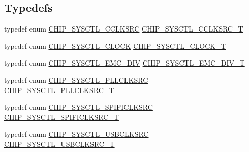 \subsection*{Typedefs}
\begin{DoxyCompactItemize}
\item 
typedef enum \hyperlink{group__CLOCK__17XX__40XX_ga1eb1eeae65911ee3e97009ae1d31d03f}{C\+H\+I\+P\+\_\+\+S\+Y\+S\+C\+T\+L\+\_\+\+C\+C\+L\+K\+S\+RC} \hyperlink{group__CLOCK__17XX__40XX_ga983f42d70f3939d1f1b46673e9e1f838}{C\+H\+I\+P\+\_\+\+S\+Y\+S\+C\+T\+L\+\_\+\+C\+C\+L\+K\+S\+R\+C\+\_\+T}
\item 
typedef enum \hyperlink{group__CLOCK__17XX__40XX_ga16115d41e6af3d543d4c5457d8d8343c}{C\+H\+I\+P\+\_\+\+S\+Y\+S\+C\+T\+L\+\_\+\+C\+L\+O\+CK} \hyperlink{group__CLOCK__17XX__40XX_ga82e75cbe777e79f448fec3987ddd978e}{C\+H\+I\+P\+\_\+\+S\+Y\+S\+C\+T\+L\+\_\+\+C\+L\+O\+C\+K\+\_\+T}
\item 
typedef enum \hyperlink{group__CLOCK__17XX__40XX_gadc2ca347f1f0b0dc25a6605aa60adc65}{C\+H\+I\+P\+\_\+\+S\+Y\+S\+C\+T\+L\+\_\+\+E\+M\+C\+\_\+\+D\+IV} \hyperlink{group__CLOCK__17XX__40XX_ga5c0927d2ce01f4ed4d10d76e44a4773e}{C\+H\+I\+P\+\_\+\+S\+Y\+S\+C\+T\+L\+\_\+\+E\+M\+C\+\_\+\+D\+I\+V\+\_\+T}
\item 
typedef enum \hyperlink{group__CLOCK__17XX__40XX_gab8e9f23b5fc6f78e50dbe7310743573d}{C\+H\+I\+P\+\_\+\+S\+Y\+S\+C\+T\+L\+\_\+\+P\+L\+L\+C\+L\+K\+S\+RC} \hyperlink{group__CLOCK__17XX__40XX_gacda7fd6d13922330ce9344dbc4ec85b7}{C\+H\+I\+P\+\_\+\+S\+Y\+S\+C\+T\+L\+\_\+\+P\+L\+L\+C\+L\+K\+S\+R\+C\+\_\+T}
\item 
typedef enum \hyperlink{group__CLOCK__17XX__40XX_gabb651badc795c7e52adc180f7bc68db2}{C\+H\+I\+P\+\_\+\+S\+Y\+S\+C\+T\+L\+\_\+\+S\+P\+I\+F\+I\+C\+L\+K\+S\+RC} \hyperlink{group__CLOCK__17XX__40XX_ga55d8797a3b68191ced784240378f74ac}{C\+H\+I\+P\+\_\+\+S\+Y\+S\+C\+T\+L\+\_\+\+S\+P\+I\+F\+I\+C\+L\+K\+S\+R\+C\+\_\+T}
\item 
typedef enum \hyperlink{group__CLOCK__17XX__40XX_gafe64d657397e7d86fbfcb031472eb70e}{C\+H\+I\+P\+\_\+\+S\+Y\+S\+C\+T\+L\+\_\+\+U\+S\+B\+C\+L\+K\+S\+RC} \hyperlink{group__CLOCK__17XX__40XX_ga0ba14bd48363645f607b49fbcc8624df}{C\+H\+I\+P\+\_\+\+S\+Y\+S\+C\+T\+L\+\_\+\+U\+S\+B\+C\+L\+K\+S\+R\+C\+\_\+T}
\end{DoxyCompactItemize}
